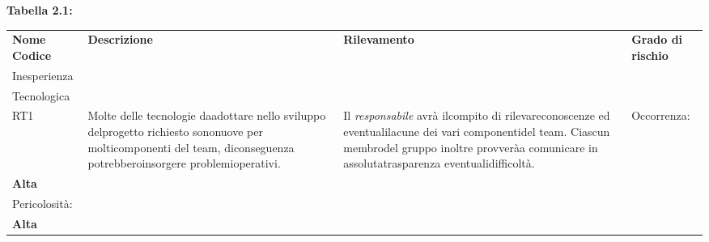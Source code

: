 \begin{center}
    \textbf{Tabella 2.1: }\\
    \vspace{10px}
    \begin{table}[h!]
    \centering
    \renewcommand{\arraystretch}{1.8}
    \begin{tabular}{p{60px} p{150px} p{150px} p{90px}}
        \rowcolor{logo!70} \textbf{Nome Codice} & \textbf{Descrizione} & \textbf{Rilevamento} & \textbf{Grado di  rischio}\\
        Inesperienza\\ Tecnologica\\ RT1 & Molte delle tecnologie daadottare nello sviluppo delprogetto richiesto sononuove per molticomponenti del team, diconseguenza potrebberoinsorgere problemioperativi. & Il \emph{responsabile} avrà ilcompito di rilevareconoscenze ed eventualilacune dei vari componentidel team. Ciascun membrodel gruppo inoltre provveràa comunicare in assolutatrasparenza eventualidifficoltà. & Occorrenza:\\\textbf{Alta}\\ Pericolosità:\\ \textbf{Alta} \\  
    \end{tabular}
\end{table}
\end{center}
